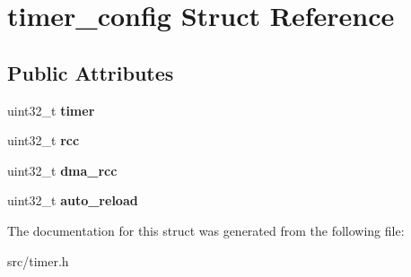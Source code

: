 \hypertarget{structtimer__config}{}\section{timer\+\_\+config Struct Reference}
\label{structtimer__config}
\subsection*{Public Attributes}
\begin{DoxyCompactItemize}
\item 
\hypertarget{structtimer__config_afed1f1ae48fa09893427efa6b8338b65}{}uint32\+\_\+t {\bfseries timer}\label{structtimer__config_afed1f1ae48fa09893427efa6b8338b65}

\item 
\hypertarget{structtimer__config_a1591c4486ebf07c8ac73e69acbbbbc3a}{}uint32\+\_\+t {\bfseries rcc}\label{structtimer__config_a1591c4486ebf07c8ac73e69acbbbbc3a}

\item 
\hypertarget{structtimer__config_a492b92e61d66e088574be5cc00d10710}{}uint32\+\_\+t {\bfseries dma\+\_\+rcc}\label{structtimer__config_a492b92e61d66e088574be5cc00d10710}

\item 
\hypertarget{structtimer__config_af0af259e1730fdfeebd34344f5a5fa1b}{}uint32\+\_\+t {\bfseries auto\+\_\+reload}\label{structtimer__config_af0af259e1730fdfeebd34344f5a5fa1b}

\end{DoxyCompactItemize}


The documentation for this struct was generated from the following file\+:\begin{DoxyCompactItemize}
\item 
src/timer.\+h\end{DoxyCompactItemize}
